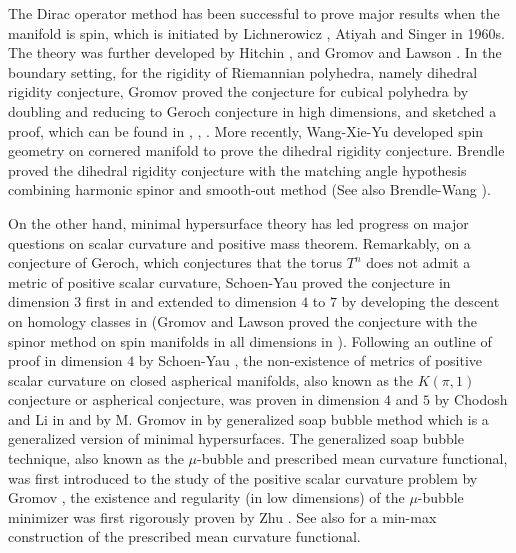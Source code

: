 \documentclass[11pt,letterpaper]{amsart}
\begin{document}
The Dirac operator method has been successful to prove major results when the manifold is spin, which is initiated by Lichnerowicz \cite{lichnerowicz1963geometrie}, Atiyah and Singer \cite{atiyah1963index} in 1960s. The theory was further developed by Hitchin \cite{hitchin1974harmonic}, and Gromov and Lawson \cite{gromov1980classification, gromov1983positive, gromov1980spin}. In the boundary setting, for the rigidity of Riemannian polyhedra, namely dihedral rigidity conjecture, Gromov proved the conjecture for cubical polyhedra by doubling and reducing to Geroch conjecture in high dimensions, and sketched a proof, which can be found in \cite{gromov2014dirac}, \cite{gromov2021lecturesscalarcurvature}, \cite{gromov2023convexpolytopesdihedralangles}. More recently, Wang-Xie-Yu \cite{wang2021gromov} developed spin geometry on cornered manifold to prove the dihedral rigidity conjecture. Brendle proved the dihedral rigidity conjecture with the matching angle hypothesis combining harmonic spinor and smooth-out method \cite{brendle2023matchingangle} (See also Brendle-Wang \cite{brendle2023gromovsrigiditytheorempolytopes}).

On the other hand, minimal hypersurface theory has led progress on major questions on scalar curvature and positive mass theorem. Remarkably, on a conjecture of Geroch, which conjectures that the torus $T^{n}$ does not admit a metric of positive scalar curvature, Schoen-Yau proved the conjecture in dimension $3$ first in \cite{schoen1979existence} and extended to dimension $4$ to $7$ by developing the descent on homology classes in \cite{schoen1987structure} (Gromov and Lawson proved the conjecture with the spinor method on spin manifolds in all dimensions in \cite{gromov1983positive}). Following an outline of proof in dimension $4$ by Schoen-Yau \cite{schoen1987structure}, the non-existence of metrics of positive scalar curvature on closed aspherical manifolds, also known as the $K(\pi,1)$ conjecture or aspherical conjecture, was proven in dimension $4$ and $5$ by Chodosh and Li in \cite{chodosh2024generalized} and by M. Gromov in \cite{gromov2020no} by generalized soap bubble method which is a generalized version of minimal hypersurfaces. The generalized soap bubble technique, also known as the $\mu$-bubble and prescribed mean curvature functional, was first introduced to the study of the positive scalar curvature problem by Gromov \cite{gromov2021lecturesscalarcurvature}, the existence and regularity (in low dimensions) of the $\mu$-bubble minimizer was first rigorously proven by Zhu \cite{zhu2021width}. See also \cite{zhou2020pmc} \cite{zhou2019cmc} for a min-max construction of the prescribed mean curvature functional.
\end{document}
